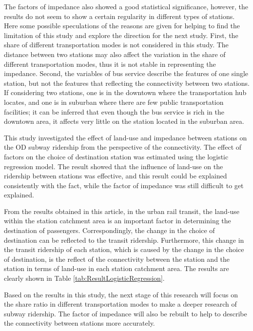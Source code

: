 \documentclass[utf8]{article}
\begin{document}
%
The factors of impedance also showed a good statistical significance, however, the results do not seem to show a certain regularity in different types of stations. Here some possible speculations of the reasons are given for helping to find the limitation of this study and explore the direction for the next study. First, the share of different transportation modes is not considered in this study. The distance between two stations may also affect the variation in the share of different transportation modes, thus it is not stable in representing the impedance.  Second, the variables of bus service describe the features of one single station, but not the features that reflecting the connectivity between two stations. If considering two stations, one is in the downtown where the transportation hub locates, and one is in suburban where there are few public transportation facilities; it can be inferred that even though the bus service is rich in the downtown area, it affects very little on the station located in the suburban area.


%
This study investigated the effect of land-use and impedance between stations on the OD subway ridership from the perspective of the connectivity. The effect of factors on the choice of destination station was estimated using the logistic regression model. The result showed that the influence of land-use on the ridership between stations was effective, and this result could be explained consistently with the fact, while the factor of impedance was still difficult to get explained.

%
From the results obtained in this article, in the urban rail transit, the land-use within the station catchment area is an important factor in determining the destination of passengers. Correspondingly, the change in the choice of destination can be reflected to the transit ridership. Furthermore, this change in the transit ridership of each station, which is caused by the change in the choice of destination, is the reflect of the connectivity between the station and the station in terms of land-use in each station catchment area. The results are clearly shown in Table \ref{tab:ResultLogisticRegression}.

%
Based on the results in this study, the next stage of this research will focus on the share ratio in different transportation modes to make a deeper research of subway ridership. The factor of impedance will also be rebuilt to help to describe the connectivity between stations more accurately.



\clearpage


\end{document}
